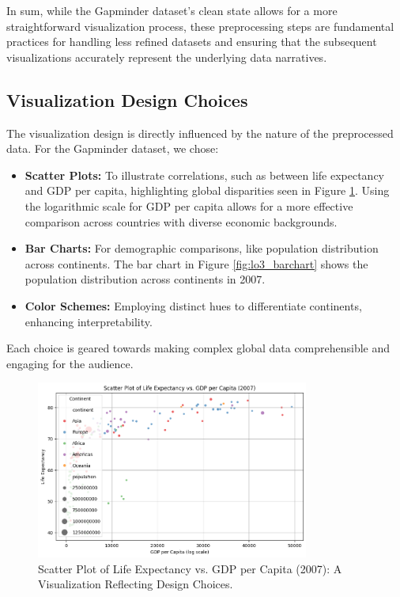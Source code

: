 In sum, while the Gapminder dataset's clean state allows for a more straightforward visualization process, these preprocessing steps are fundamental practices for handling less refined datasets and ensuring that the subsequent visualizations accurately represent the underlying data narratives.

\subsection{Visualization Design Choices}
The visualization design is directly influenced by the nature of the preprocessed data. For the Gapminder dataset, we chose:
\begin{itemize}
  \item \textbf{Scatter Plots:} To illustrate correlations, such as between life expectancy and GDP per capita, highlighting global disparities seen in Figure \ref{fig:lo3_scatterplot}. Using the logarithmic scale for GDP per capita allows for a more effective comparison across countries with diverse economic backgrounds.
  \item \textbf{Bar Charts:} For demographic comparisons, like population distribution across continents. The bar chart in Figure \ref{fig:lo3_barchart} shows the population distribution across continents in 2007.
  \item \textbf{Color Schemes:} Employing distinct hues to differentiate continents, enhancing interpretability.
\end{itemize}

Each choice is geared towards making complex global data comprehensible and engaging for the audience.

\begin{figure}[h]
    \centering
    \includegraphics[width=0.8\textwidth]{images/plots/lo3_scatterplot.png} 
    \caption{Scatter Plot of Life Expectancy vs. GDP per Capita (2007): A Visualization Reflecting Design Choices.}
    \label{fig:lo3_scatterplot}
\end{figure}

